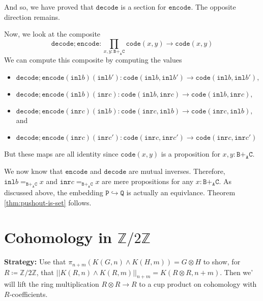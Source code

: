 \documentclass[12pt]{amsart}
\newcommand{\ZZ}{\mathbb{Z}}
\newcommand{\zmodtwo}{\ZZ / 2 \ZZ}
\newcommand{\from}{\colon}
\newcommand{\type}[1]{\mathtt{#1}}
\newcommand{\tin}{\colon}
\newcommand{\A}{\type{A}}
\newcommand{\B}{\type{B}}
\newcommand{\C}{\type{C}}
\renewcommand{\P}{\type{P}}
\newcommand{\Q}{\type{Q}}
\newcommand{\BAC}{\B +_{\A} \C}
\newcommand{\inl}{\type{inl}}
\newcommand{\inr}{\type{inr}}
\newcommand{\code}{\type{code}}
\newcommand{\encode}{\type{encode}}
\newcommand{\decode}{\type{decode}}
\theoremstyle{remark}
\theoremstyle{definition}
\begin{document}
And so, we have proved that \( \decode \) is a section for \( \encode
\). The opposite direction remains.


Now, we look at the composite
\[
  \decode ; \encode \from
  \prod\limits_{x,y \tin \BAC} \code ( x,y ) \to
  \code ( x,y )
\]
We can compute this composite by computing the values
%
\begin{itemize}
\item
  \(
    \decode ; \encode (\inl b ) ( \inl b' ) \from
    \code ( \inl b , \inl b' ) \to
    \code ( \inl b , \inl b' ),
  \)
\item
  \(
    \decode ; \encode (\inl b ) ( \inr c ) \from
    \code ( \inl b , \inr c ) \to
    \code ( \inl b , \inr c ),
  \)
\item
  \(
    \decode ; \encode (\inr c ) ( \inl b ) \from
    \code ( \inr c , \inl b ) \to
    \code ( \inr c , \inl b ),
    \)
  and  
\item
  \(
    \decode ; \encode (\inr c ) ( \inr c' ) \from
    \code ( \inr c , \inr c' ) \to
    \code ( \inr c , \inr c' )
  \)
\end{itemize}
%
But these maps are all identity since \( \code (x,y) \) is a
proposition for \( x , y \tin \BAC \).   
\par


We now know that
% 
\(
    \encode
\)
%
and
%
\(
    \decode
\)
% 
are mutual inverses. Therefore,
% 
\(
    \inl b =_{ \BAC  } x
\)
% 
and
%
\(
    \inr c =_{ \BAC } x
\)
% 
are mere propositions for any
%
\(
    x \tin \BAC.
\)
% 
As discussed above, the embedding
% 
\(
    \P \hookrightarrow \Q
\)
%
is actually an equivlance. Theorem \ref{thm:pushout-is-set} follows.

\section{Cohomology in $ \zmodtwo $}
\label{sec:cohomology--zz2zz}

\textbf{Strategy:}
Use that $ \pi_{n+m} ( K(G,n) \wedge K(H,m) ) = G \otimes H
$ to show, for $ R \coloneqq \zmodtwo $, that $ || K(R,n)
\wedge K(R,m) ||_{n+m} = K( R \otimes R, n+m ) $. Then we' will
lift the ring multiplication $ R \otimes R \to R $ to a cup
product on cohomology with $ R $-coefficients.
\end{document}
